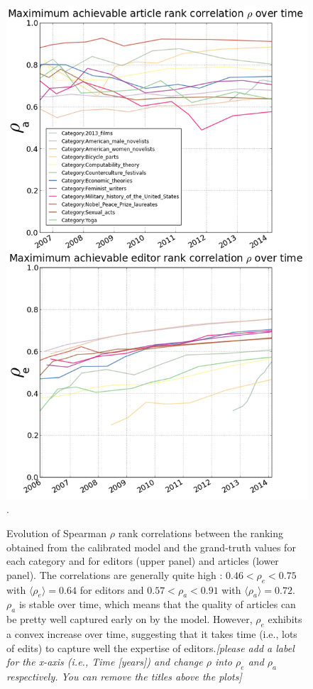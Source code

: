  \begin{figure}[!t]
 \centering
\includegraphics[width=0.9\columnwidth]{Figures/rho_combined.png}.
\caption{Evolution of Spearman $\rho$ rank correlations between the ranking obtained from the calibrated model and the grand-truth values for each category and for editors (upper panel)  and articles (lower panel). The correlations are generally quite high : $ 0.46 < \rho_e < 0.75$ with $\langle \rho_e\rangle = 0.64$ for editors and $0.57 < \rho_a < 0.91$ with $\langle \rho_a\rangle = 0.72$. $\rho_{a}$  is stable over time, which means that the quality of articles can be pretty well captured early on by the model. However, $\rho_e$ exhibits a convex increase over time, suggesting that it takes time (i.e., lots of edits) to capture well the expertise of editors.{\it [please add a label for the x-axis (i.e., Time [years]) and change $\rho$ into $\rho_e$ and $\rho_a$ respectively. You can remove the titles above the  plots]}}
 \label{fig:rhotime}
 \end{figure}

